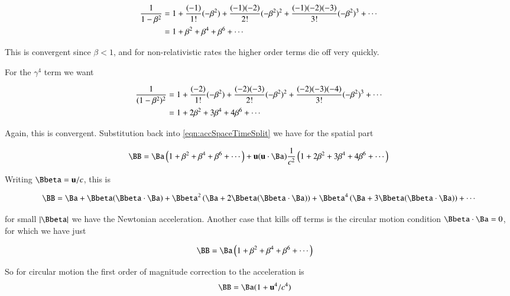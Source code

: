 \begin{align*}
\frac{1}{1 - \beta^2} 
&=
1 
+ \frac{(-1)}{1!}(-\beta^2)
+ \frac{(-1)(-2)}{2!}(-\beta^2)^2
+ \frac{(-1)(-2)(-3)}{3!}(-\beta^2)^3
+ \cdots \\
&=
1 
+ \beta^2
+ \beta^4
+ \beta^6
+ \cdots \\
\end{align*}

This is convergent since $\beta < 1$, and for non-relativistic rates the higher order terms die off very quickly.

For the $\gamma^4$ term we want

\begin{align*}
\frac{1}{(1 - \beta^2)^2} 
&=
1 
+ \frac{(-2)}{1!}(-\beta^2)
+ \frac{(-2)(-3)}{2!}(-\beta^2)^2
+ \frac{(-2)(-3)(-4)}{3!}(-\beta^2)^3
+ \cdots \\
&=
1 
+ 2 \beta^2
+ 3 \beta^4
+ 4 \beta^6
+ \cdots \\
\end{align*}

Again, this is convergent.  Substitution back into \ref{eqn:accSpaceTimeSplit} we have for the spatial part

\begin{align*}
\BB &= \Ba 
\left(
1 
+ \beta^2
+ \beta^4
+ \beta^6
+ \cdots
\right)
+ \Bu (\Bu \cdot \Ba) \inv{c^2} 
\left(
1 
+ 2 \beta^2
+ 3 \beta^4
+ 4 \beta^6
+ \cdots 
\right)
\\
\end{align*}

Writing $\Bbeta = \Bu/c$, this is

\begin{align*}
\BB &= 
\Ba + \Bbeta (\Bbeta \cdot \Ba) 
+ \Bbeta^2 \left( \Ba + 2 \Bbeta (\Bbeta \cdot \Ba) \right)
+ \Bbeta^4 \left( \Ba + 3 \Bbeta (\Bbeta \cdot \Ba) \right)
+ \cdots
\\
\end{align*}

for small $\Abs{\Bbeta}$ we have the Newtonian acceleration.  Another case that kills off terms is the circular motion condition $\Bbeta \cdot \Ba = 0$, for which we have just

\begin{align*}
\BB &= \Ba 
\left(
1 
+ \beta^2
+ \beta^4
+ \beta^6
+ \cdots
\right)
\end{align*}

So for circular motion the first order of magnitude correction to the acceleration is 
\begin{align*}
\BB &= \Ba ( 1 + \Bu^4/c^4 )
\end{align*}

